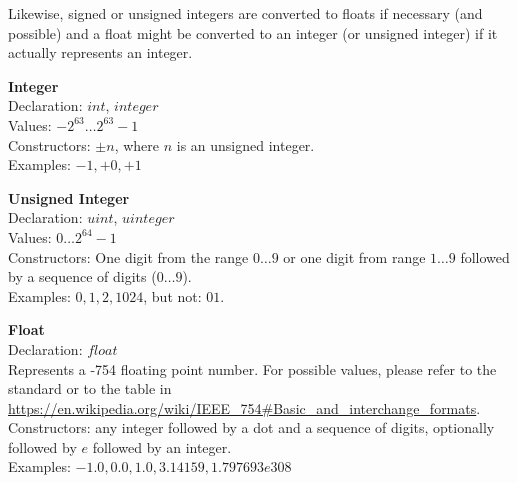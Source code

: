Likewise, signed or unsigned integers are converted to floats
if necessary (and possible) and a float might be converted
to an integer (or unsigned integer) if it actually
represents an integer.

\begin{minipage}{\textwidth}
\textbf{Integer}\\
Declaration: $int$, $integer$ \\
Values: $-2^{63} \dots 2^{63}-1$ \\
Constructors: $\pm n$, where $n$ is an unsigned integer.\\
Examples: $-1, +0, +1$
\end{minipage}

\begin{minipage}{\textwidth}
\textbf{Unsigned Integer} \\
Declaration: $uint$, $uinteger$ \\
Values: $0 \dots 2^{64}-1$  \\
Constructors: One digit from the range $0\dots 9$
or one digit from range $1\dots 9$ followed by
a sequence of digits ($0\dots9$). \\
Examples: $0, 1, 2, 1024$, but not: $01$.
\end{minipage}

\begin{minipage}{\textwidth}
\textbf{Float} \\
Declaration: $float$ \\
Represents a  -754 floating point number.
For possible values, please refer to the standard or to the table in
\url{https://en.wikipedia.org/wiki/IEEE\_754#Basic\_and\_interchange\_formats}.\\
Constructors: any integer followed by a dot and a sequence of digits,
              optionally followed by $e$ followed by an integer.
               \\
Examples: $-1.0, 0.0, 1.0, 3.14159, 1.797693e308$ 
\end{minipage}

